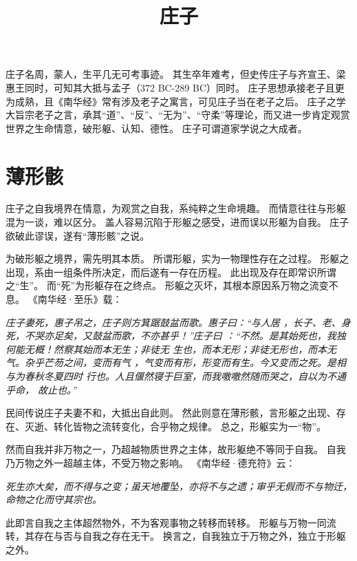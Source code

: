 \documentclass[11pt]{article}
\title{庄子}
\date{}
\begin{document}
  \maketitle
  
  \newpage

  \linenumbers

庄子名周，蒙人，生平几无可考事迹。
其生卒年难考，但史传庄子与齐宣王、梁惠王同时，可知其大抵与孟子（372 BC-289 BC）同时。
庄子思想承接老子且更为成熟，且《南华经》常有涉及老子之寓言，可见庄子当在老子之后。
庄子之学大旨宗老子之言，承其“道”、“反”、“无为”、“守柔”等理论，而又进一步肯定观赏世界之生命情意，破形躯、认知、德性。
庄子可谓道家学说之大成者。

\section{薄形骸}
庄子之自我境界在情意，为观赏之自我，系纯粹之生命境趣。
而情意往往与形躯混为一谈，难以区分。
盖人容易沉陷于形躯之感受，进而误以形躯为自我。
庄子欲破此谬误，遂有“薄形骸”之说。

\newline

为破形躯之境界，需先明其本质。
所谓形躯，实为一物理性存在之过程。
形躯之出现，系由一组条件所决定，而后遂有一存在历程。
此出现及存在即常识所谓之“生”。
而“死”为形躯存在之终点。
形躯之灭坏，其根本原因系万物之流变不息。
《南华经·至乐》载：

\textit{庄子妻死，惠子吊之，庄子则方箕踞鼓盆而歌。惠子曰：“与人居 ，长子、老、身死，不哭亦足矣，又鼓盆而歌，不亦甚乎！”庄子曰 ：“不然。是其始死也，我独何能无概！然察其始而本无生；非徒无 生也，而本无形；非徒无形也，而本无气。杂乎芒芴之间，变而有气 ，气变而有形，形变而有生。今又变而之死。是相与为春秋冬夏四时 行也。人且偃然寝于巨室，而我噭噭然随而哭之，自以为不通乎命， 故止也。”}

民间传说庄子夫妻不和，大抵出自此则。
然此则意在薄形骸，言形躯之出现、存在、灭逝、转化皆物之流转变化，合乎物之规律。
总之，形躯实为一“物”。

\newline

然而自我并非万物之一，乃超越物质世界之主体，故形躯绝不等同于自我。
自我乃万物之外一超越主体，不受万物之影响。
《南华经·德充符》云：


\textit{死生亦大矣，而不得与之变；虽天地覆坠，亦将不与之遗；审乎无假而不与物迁，命物之化而守其宗也。}

此即言自我之主体超然物外，不为客观事物之转移而转移。
形躯与万物一同流转，其存在与否与自我之存在无干。
换言之，自我独立于万物之外，独立于形躯之外。
\end{document}
